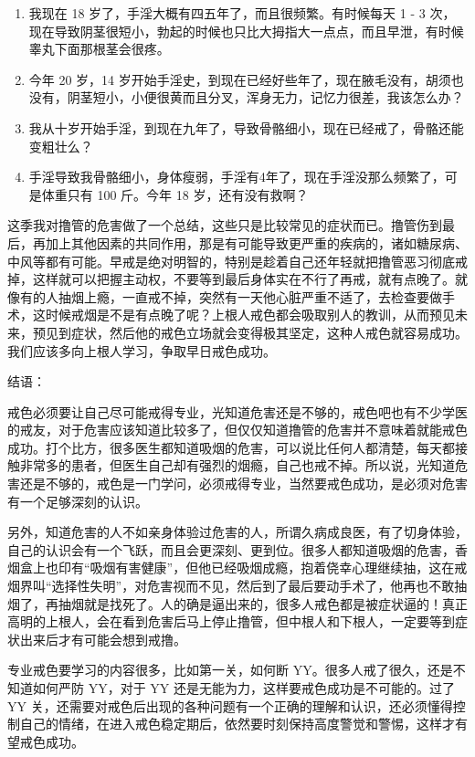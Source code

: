 \documentclass{ctexart}
\begin{document}
\begin{enumerate}
    \item 我现在 18 岁了，手淫大概有四五年了，而且很频繁。有时候每天 1 - 3 次，现在导致阴茎很短小，勃起的时候也只比大拇指大一点点，而且早泄，有时候睾丸下面那根茎会很疼。
    \item 今年 20 岁，14 岁开始手淫史，到现在已经好些年了，现在腋毛没有，胡须也没有，阴茎短小，小便很黄而且分叉，浑身无力，记忆力很差，我该怎么办？
    \item 我从十岁开始手淫，到现在九年了，导致骨骼细小，现在已经戒了，骨骼还能变粗壮么？
    \item 手淫导致我骨骼细小，身体瘦弱，手淫有4年了，现在手淫没那么频繁了，可是体重只有 100 斤。今年 18 岁，还有没有救啊？
\end{enumerate}

这季我对撸管的危害做了一个总结，这些只是比较常见的症状而已。撸管伤到最后，再加上其他因素的共同作用，那是有可能导致更严重的疾病的，诸如糖尿病、中风等都有可能。早戒是绝对明智的，特别是趁着自己还年轻就把撸管恶习彻底戒掉，这样就可以把握主动权，不要等到最后身体实在不行了再戒，就有点晚了。就像有的人抽烟上瘾，一直戒不掉，突然有一天他心脏严重不适了，去检查要做手术，这时候戒烟是不是有点晚了呢？上根人戒色都会吸取别人的教训，从而预见未来，预见到症状，然后他的戒色立场就会变得极其坚定，这种人戒色就容易成功。我们应该多向上根人学习，争取早日戒色成功。

结语：

戒色必须要让自己尽可能戒得专业，光知道危害还是不够的，戒色吧也有不少学医的戒友，对于危害应该知道比较多了，但仅仅知道撸管的危害并不意味着就能戒色成功。打个比方，很多医生都知道吸烟的危害，可以说比任何人都清楚，每天都接触非常多的患者，但医生自己却有强烈的烟瘾，自己也戒不掉。所以说，光知道危害还是不够的，戒色是一门学问，必须戒得专业，当然要戒色成功，是必须对危害有一个足够深刻的认识。

另外，知道危害的人不如亲身体验过危害的人，所谓久病成良医，有了切身体验，自己的认识会有一个飞跃，而且会更深刻、更到位。很多人都知道吸烟的危害，香烟盒上也印有“吸烟有害健康”，但他已经吸烟成瘾，抱着侥幸心理继续抽，这在戒烟界叫“选择性失明”，对危害视而不见，然后到了最后要动手术了，他再也不敢抽烟了，再抽烟就是找死了。人的确是逼出来的，很多人戒色都是被症状逼的！真正高明的上根人，会在看到危害后马上停止撸管，但中根人和下根人，一定要等到症状出来后才有可能会想到戒撸。

专业戒色要学习的内容很多，比如第一关，如何断 YY。很多人戒了很久，还是不知道如何严防 YY，对于 YY 还是无能为力，这样要戒色成功是不可能的。过了 YY 关，还需要对戒色后出现的各种问题有一个正确的理解和认识，还必须懂得控制自己的情绪，在进入戒色稳定期后，依然要时刻保持高度警觉和警惕，这样才有望戒色成功。
\end{document}
